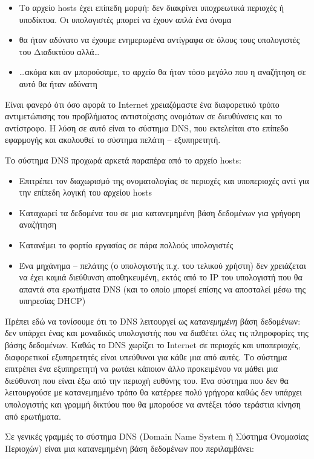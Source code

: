\begin{itemize}
\item Το αρχείο hosts έχει επίπεδη μορφή: δεν διακρίνει υποχρεωτικά περιοχές ή υποδίκτυα. Οι υπολογιστές μπορεί να έχουν απλά ένα όνομα
\item θα ήταν αδύνατο να έχουμε ενημερωμένα αντίγραφα σε όλους τους υπολογιστές του Διαδικτύου αλλά\ldots
\item \ldots{}ακόμα και αν μπορούσαμε, το αρχείο θα ήταν τόσο μεγάλο που η αναζήτηση σε αυτό θα ήταν αδύνατη
\end{itemize}

Είναι φανερό ότι όσο αφορά το Internet χρειαζόμαστε ένα διαφορετικό τρόπο αντιμετώπισης του προβλήματος αντιστοίχισης ονομάτων σε διευθύνσεις και το αντίστροφο. Η λύση σε αυτό είναι το σύστημα DNS, που εκτελείται στο επίπεδο εφαρμογής και ακολουθεί το σύστημα πελάτη -- εξυπηρετητή.

Το σύστημα DNS προχωρά αρκετά παραπέρα από το αρχείο hosts:

\begin{itemize}
\item Επιτρέπει τον διαχωρισμό της ονοματολογίας σε περιοχές και υποπεριοχές αντί για την επίπεδη λογική του αρχείου hosts
\item Καταχωρεί τα δεδομένα του σε μια κατανεμημένη βάση δεδομένων για γρήγορη αναζήτηση
\item Κατανέμει το φορτίο εργασίας σε πάρα πολλούς υπολογιστές
\item Ένα μηχάνημα -- πελάτης (ο υπολογιστής π.χ. του τελικού χρήστη) δεν χρειάζεται να έχει καμιά διεύθυνση αποθηκευμένη, εκτός από το IP του υπολογιστή που θα απαντά στα ερωτήματα DNS (και το οποίο μπορεί επίσης να αποσταλεί μέσω της υπηρεσίας DHCP)
\end{itemize}

Πρέπει εδώ να τονίσουμε ότι το DNS λειτουργεί ως \emph{κατανεμημένη} βάση δεδομένων: δεν υπάρχει ένας και μοναδικός υπολογιστής που να διαθέτει όλες τις πληροφορίες της βάσης δεδομένων. Καθώς το DNS χωρίζει το Internet σε περιοχές και υποπεριοχές, διαφορετικοί εξυπηρετητές είναι υπεύθυνοι για κάθε μια από αυτές. Το σύστημα επιτρέπει ένα εξυπηρετητή να ρωτάει κάποιον άλλο προκειμένου να μάθει μια διεύθυνση που είναι έξω από την περιοχή ευθύνης του. Ένα σύστημα που δεν θα λειτουργούσε με κατανεμημένο τρόπο θα κατέρρεε πολύ γρήγορα καθώς δεν υπάρχει υπολογιστής και γραμμή δικτύου που θα μπορούσε να αντέξει τόσο τεράστια κίνηση από ερωτήματα.

Σε γενικές γραμμές το σύστημα DNS (Domain Name System ή Σύστημα Ονομασίας Περιοχών) είναι μια κατανεμημένη βάση δεδομένων που περιλαμβάνει:

